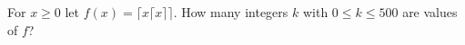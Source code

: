 For $x\ge0$ let $f(x)=\lceil x\lceil x\rceil\rceil$. How many integers $k$ with $0\le k\le500$ are values of $f$?
